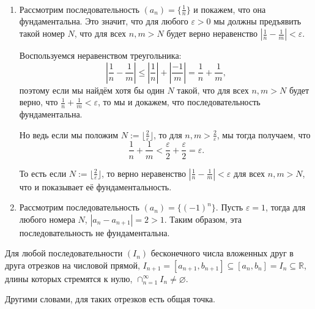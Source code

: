 \begin{example}~
    \begin{enumerate}
        \item Рассмотрим последовательность $(a_n) = \{\frac{1}{n}\}$ и покажем, что она фундаментальна. Это значит, что для любого $\varepsilon >0$ мы должны предъявить такой номер $N$, что для всех $n,m > N$ будет верно неравенство $|\frac{1}{n}  - \frac{1}{m}| < \varepsilon$.

        Воспользуемся неравенством треугольника:
        \[  
          \left|\frac{1}{n}  - \frac{1}{m} \right| \le \left| \frac{1}{n}\right| + \left| \frac{-1}{m} \right| = \frac{1}{n} + \frac{1}{m}, 
        \]
        поэтому если мы найдём хотя бы один $N$ такой, что для всех $n,m >N$ будет верно, что $ \frac{1}{n} + \frac{1}{m} <\varepsilon$, то мы и докажем, что последовательность фундаментальна. 

        Но ведь если мы положим $N:=\lfloor \frac{2}{\varepsilon} \rfloor$, то для $n,m > \frac{2}{\varepsilon}$, мы тогда получаем, что 
        \[
         \frac{1}{n} + \frac{1}{m} < \frac{\varepsilon}{2} + \frac{\varepsilon}{2} = \varepsilon.
        \]

        То есть если $N:=\lfloor \frac{2}{\varepsilon} \rfloor$, то верно неравенство $|\frac{1}{n}  - \frac{1}{m}| < \varepsilon$ для всех $n,m >N$, что и показывает её фундаментальность.


        \item Рассмотрим последовательность $(a_n) = \{(-1)^n\}$. Пусть $\varepsilon = 1$, тогда для любого номера $N$, $|a_n - a_{n+1}| = 2 >1$. Таким образом, эта последовательность не фундаментальна.
    \end{enumerate}
\end{example}


\begin{lemma}\label{cap_of_intervals}
    Для любой последовательности $(I_n)$ бесконечного числа вложенных друг в друга отрезков на числовой прямой, \ie $I_{n+1} = [a_{n+1}, b_{n+1}] \subseteq [a_n, b_n] = I_n \subseteq \mathbb{R}$, длины которых стремятся к нулю, $\cap_{n=1}^\infty I_n \ne \varnothing.$ 
\end{lemma}

Другими словами, для таких отрезков есть общая точка.

